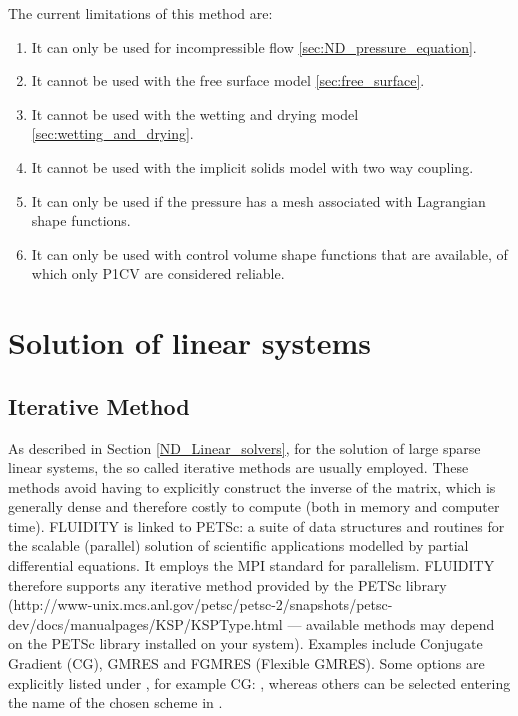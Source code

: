 The current limitations of this method are:
\begin{enumerate}
  \item It can only be used for incompressible flow \ref{sec:ND_pressure_equation}.
  \item It cannot be used with the free surface model \ref{sec:free_surface}.
  \item It cannot be used with the wetting and drying model \ref{sec:wetting_and_drying}.
  \item It cannot be used with the implicit solids model with two way coupling.
  \item It can only be used if the pressure has a mesh associated with Lagrangian shape functions.
  \item It can only be used with control volume shape functions that are available, of which only P1CV are considered reliable. 
\end{enumerate}

\section{Solution of linear systems}\label{sec:Solve}

\subsection{Iterative Method}
As described in Section \ref{ND_Linear_solvers}, for the solution of large sparse linear systems, the so called iterative methods are usually employed. These methods avoid having to explicitly construct the inverse of the matrix, which is generally dense and therefore costly to compute (both in memory and computer time). FLUIDITY is linked to PETSc: a suite of data structures and routines for the scalable (parallel) solution of scientific applications modelled by partial differential equations.  It employs the MPI standard for parallelism. FLUIDITY therefore supports any iterative method provided by the PETSc library (http://www-unix.mcs.anl.gov/petsc/petsc-2/snapshots/petsc-dev/docs/manualpages/KSP/KSPType.html --- available methods may depend on the PETSc library installed on your system). Examples include Conjugate Gradient (CG), GMRES and FGMRES (Flexible GMRES). Some options are explicitly listed under , for example CG: , whereas others can be selected entering the name of the chosen scheme in .

